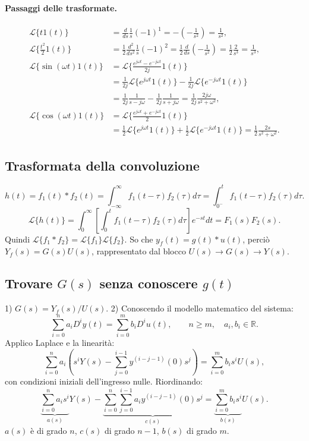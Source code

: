 \paragraph{Passaggi delle trasformate.}
\begin{align*}
\mathcal L\{t1(t)\}&=\frac d{ds}\frac1s(-1)^1=-\left(-\frac1{s^2}\right)=\frac1{s^2},\\
\mathcal L\{\tfrac{t^2}{2}1(t)\}&=\frac12\frac{d^2}{ds^2}\frac1s(-1)^2
=\frac12\frac d{ds}\left(-\frac1{s^2}\right)=\frac12\frac2{s^3}=\frac1{s^3},\\
\mathcal L\{\sin(\omega t)1(t)\}&=\mathcal L\{\tfrac{e^{j\omega t}-e^{-j\omega t}}{2j}1(t)\}\\
&=\tfrac1{2j}\mathcal L\{e^{j\omega t}1(t)\}-\tfrac1{2j}\mathcal L\{e^{-j\omega t}1(t)\}\\
&=\tfrac1{2j}\tfrac1{s-j\omega}-\tfrac1{2j}\tfrac1{s+j\omega}
=\tfrac1{2j}\tfrac{2j\omega}{s^2+\omega^2},\\
\mathcal L\{\cos(\omega t)1(t)\}&=\mathcal L\{\tfrac{e^{j\omega t}+e^{-j\omega t}}2 1(t)\}\\
&=\tfrac12\mathcal L\{e^{j\omega t}1(t)\}+\tfrac12\mathcal L\{e^{-j\omega t}1(t)\}
=\tfrac12\tfrac{2s}{s^2+\omega^2}.
\end{align*}

\subsection*{Trasformata della convoluzione}
\[h(t)=f_1(t)*f_2(t)=\int_{-\infty}^{\infty}f_1(t-\tau)f_2(\tau)d\tau=\int_{0^-}^{t}f_1(t-\tau)f_2(\tau)d\tau.\]
\[\mathcal L\{h(t)\}=\int_0^\infty\left[\int_0^t f_1(t-\tau)f_2(\tau)d\tau\right]e^{-st}dt=F_1(s)F_2(s).\]
Quindi $\mathcal L\{f_1*f_2\}=\mathcal L\{f_1\}\mathcal L\{f_2\}$. So che $y_f(t)=g(t)*u(t)$, perciò $Y_f(s)=G(s)U(s)$, rappresentato dal blocco $U(s)\to\boxed{G(s)}\to Y(s)$.
\subsection*{Trovare $G(s)$ senza conoscere $g(t)$}
1) $G(s)=Y_f(s)/U(s)$. 2) Conoscendo il modello matematico del sistema:
\[\sum_{i=0}^{n}a_iD^iy(t)=\sum_{i=0}^{m}b_iD^iu(t),\qquad n\ge m,\quad a_i,b_i\in\mathbb R.\]
Applico Laplace e la linearità:
\[\sum_{i=0}^{n}a_i\left(s^iY(s)-\sum_{j=0}^{i-1}y^{(i-j-1)}(0)s^j\right)=\sum_{i=0}^{m}b_i s^iU(s),\]
con condizioni iniziali dell'ingresso nulle. Riordinando:
\[\underbrace{\sum_{i=0}^{n}a_i s^i}_{a(s)}Y(s)-\underbrace{\sum_{i=0}^{n}\sum_{j=0}^{i-1}a_i y^{(i-j-1)}(0)s^j}_{c(s)}=\underbrace{\sum_{i=0}^{m}b_i s^i}_{b(s)}U(s).\]
$a(s)$ è di grado $n$, $c(s)$ di grado $n-1$, $b(s)$ di grado $m$.
